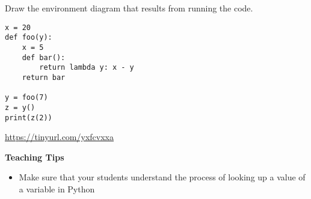 \begin{blocksection}
\question Draw the environment diagram that results from running the code.

\begin{lstlisting}
x = 20
def foo(y):
    x = 5
    def bar():
        return lambda y: x - y
    return bar

y = foo(7)
z = y()
print(z(2))
\end{lstlisting}

\begin{solution}[2in]
\url{https://tinyurl.com/yxfcvxxa}
\end{solution}
\end{blocksection}

\begin{guide}
    \begin{blocksection}
    \textbf{Teaching Tips}
      \begin{itemize}
        \item Make sure that your students understand the process of looking up a value of a variable in Python
      \end{itemize}
    \end{blocksection}
\end{guide}
    